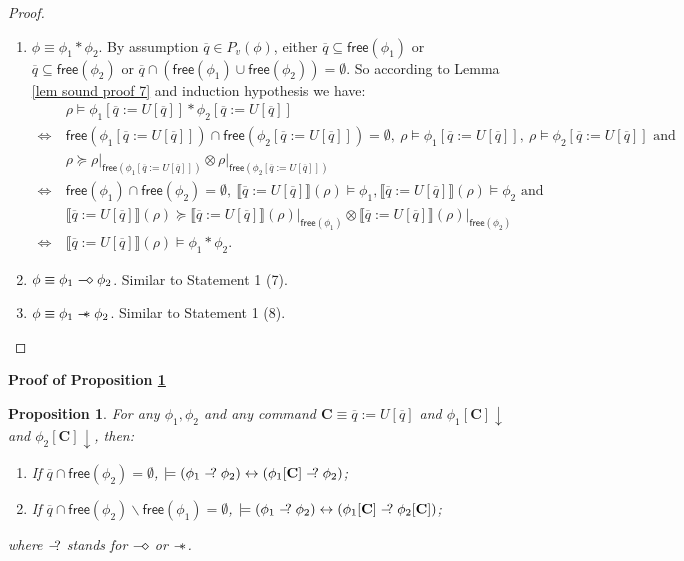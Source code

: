 \documentclass[conference,compsoc, 10pt]{IEEEtran}
\newtheorem{proposition}{Proposition}[section]
\newcommand {\qbar} {{\overline{q}}}
\newcommand {\qU} {{\overline{q}:=U[\overline{q}]}}
\newcommand{\Mexist}{{\downarrow}}
\newcommand {\free }[1] {{\mathsf{free}\left(#1\right)}}
\newcommand {\rt }[2] {{\left.{#1}\right|_{#2}}}
\newcommand {\prog } {{\mathbf{C}}}
\newcommand {\sepimp} {\mathrel{-\mkern-6mu*}}
\newcommand {\sem}[1] {\llbracket#1\rrbracket}
\newcommand {\sdimp} {\mathrel{-\mkern-2.5mu\diamond}}
\newcommand {\qmimp} {\mathrel{-\mkern-6mu?}}
\begin{document}
\begin{appendices}
\begin{proof}
\begin{enumerate}
				\item $\phi \equiv \phi_1\ast\phi_2$. By assumption $\qbar\in P_v(\phi)$, either $\qbar\subseteq\free{\phi_1}$ or $\qbar\subseteq\free{\phi_2}$ or $\qbar\cap(\free{\phi_1}\cup\free{\phi_2}) = \emptyset$. So according to Lemma \ref{lem sound proof 7} and induction hypothesis we have:
				\begin{align*}
				&\rho\models\phi_1[\qU] \ast \phi_2[\qU] \\
				\Longleftrightarrow\ &\free{\phi_1[\qU]}\cap\free{\phi_2[\qU]} = \emptyset,\ \rho\models\phi_1[\qU],\ \rho\models\phi_2[\qU] \text{\ and\ }\\
				& \rho\succeq\rt{\rho}{\free{\phi_1[\qU]}}\otimes\rt{\rho}{\free{\phi_2[\qU]}} \\
				\Longleftrightarrow\ &\free{\phi_1}\cap\free{\phi_2} = \emptyset,\ \sem{\qU}(\rho)\models\phi_1, \sem{\qU}(\rho)\models\phi_2 \text{\ and\ }\\
				&\sem{\qU}(\rho)\succeq\rt{\sem{\qU}(\rho)}{\free{\phi_1}}\otimes\rt{\sem{\qU}(\rho)}{\free{\phi_2}} \\
				\Longleftrightarrow\ &\sem{\qU}(\rho)\models\phi_1\ast\phi_2. 
				\end{align*}
				
				\item $\phi \equiv \phi_1\sdimp\phi_2$.  Similar to Statement 1 (7).
				
				\item $\phi \equiv \phi_1\sepimp\phi_2$.  Similar to Statement 1 (8).
			\end{enumerate}
			
			
		\end{proof}
		
		
		
		
		\vspace{0.5cm}
		
		\noindent\textbf{Proof of Proposition \ref{prop equal substitution unitary}}
		
		\begin{proposition}
			\label{prop equal substitution unitary}
			For any $\phi_1,\phi_2$ and any command $\prog\equiv\qU$ and $\phi_1[\prog]\Mexist$ and $\phi_2[\prog]\Mexist$, then:
			\begin{enumerate}
				\item If $\qbar\cap\free{\phi_2} = \emptyset$, $\models (\phi_1\qmimp\phi_2) \leftrightarrow (\phi_1[\prog]\qmimp\phi_2)$; 
				\item If $\qbar\cap\free{\phi_2}\backslash\free{\phi_1} = \emptyset$, $\models (\phi_1\qmimp\phi_2) \leftrightarrow (\phi_1[\prog]\qmimp\phi_2[\prog])$; 
			\end{enumerate}
			where $\qmimp$ stands for $\sdimp$ or $\sepimp$.
		\end{proposition}
		

\end{appendices}
\end{document}
